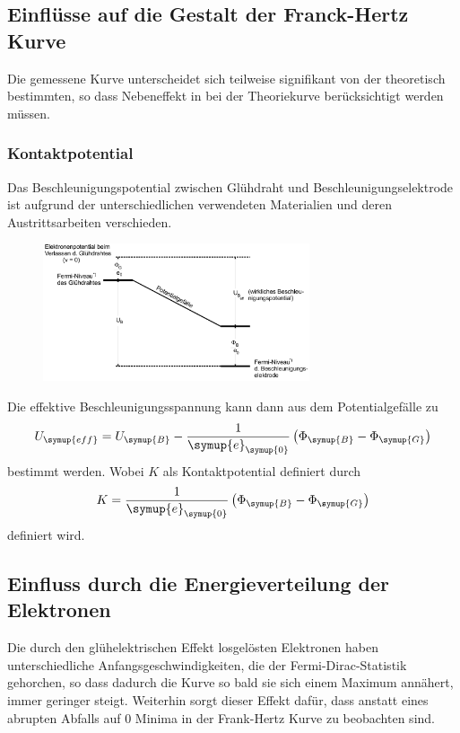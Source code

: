 \subsection{Einflüsse auf die Gestalt der Franck-Hertz Kurve}
\label{sec:Einflüsse}
Die gemessene Kurve unterscheidet sich teilweise signifikant von der theoretisch bestimmten, so dass Nebeneffekt
in bei der Theoriekurve berücksichtigt werden müssen.

\subsubsection{Kontaktpotential}
\label{Kontaktpotential}
Das Beschleunigungspotential zwischen Glühdraht und Beschleunigungselektrode ist aufgrund der unterschiedlichen
verwendeten Materialien und deren Austrittsarbeiten verschieden.
\begin{figure}
    \centering
    \includegraphics[width=0.7\textwidth]{Bilder/Kontaktpotential.png}
\end{figure}
Die effektive Beschleunigungsspannung kann dann aus dem Potentialgefälle zu
\begin{equation}
    \label{eqn:Ueff}
    U_{\symup{eff}} = U_{\symup{B}} - \frac{1}{\symup{e}_{\symup{0}}}\left(\Phi_{\symup{B}}-\Phi_{\symup{G}}\right)
\end{equation}
bestimmt werden. Wobei $K$ als Kontaktpotential definiert durch
\begin{equation}
    \label{eqn:Kontaktpotential}
    K = \frac{1}{\symup{e}_{\symup{0}}}\left(\Phi_{\symup{B}}-\Phi_{\symup{G}}\right)
\end{equation}
definiert wird.

\subsection{Einfluss durch die Energieverteilung der Elektronen}
\label{sec:Energieverteilung}
Die durch den glühelektrischen Effekt losgelösten Elektronen haben unterschiedliche Anfangsgeschwindigkeiten,
die der Fermi-Dirac-Statistik gehorchen, so dass dadurch die Kurve so bald sie sich einem Maximum annähert,
immer geringer steigt. Weiterhin sorgt dieser Effekt dafür, dass anstatt eines abrupten Abfalls auf 0 Minima
in der Frank-Hertz Kurve zu beobachten sind.


